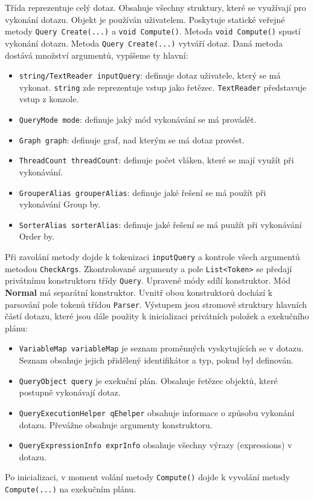 Třída reprezentuje celý dotaz.
Obsahuje všechny struktury, které se využívají pro vykonání dotazu.
Objekt je používán uživatelem.
Poskytuje statické veřejné metody \texttt{Query Create(...)} a \texttt{void Compute()}.
Metoda \texttt{void Compute()} spustí vykonání dotazu.
Metoda \texttt{Query Create(...)} vytváří dotaz.
Daná metoda dostává množství argumentů, vypíšeme ty hlavní:
\begin{itemize}
\item \texttt{string/TextReader inputQuery}: definuje dotaz uživatele, který se má vykonat. \texttt{string} zde reprezentuje vstup jako řetězec. \texttt{TextReader} představuje vstup z konzole.
\item \texttt{QueryMode mode}: definuje jaký mód vykonávání se má provádět.
\item \texttt{Graph graph}: definuje graf, nad kterým se má dotaz provést.
\item \texttt{ThreadCount threadCount}: definuje počet vláken, které se mají využít při vykonávání.
\item \texttt{GrouperAlias grouperAlias}: definuje jaké řešení se má použít při vykonávání Group by.
\item \texttt{SorterAlias sorterAlias}: definuje jaké řešení se má puužít při vykonávání Order by.
\end{itemize}
Při zavolání metody dojde k tokenizaci \texttt{inputQuery} a kontrole všech argumentů metodou \texttt{CheckArgs}.
Zkontrolované argumenty a pole \texttt{List<Token>} se předají privátnímu konstruktoru třídy \texttt{Query}.
Upravené módy sdílí konstruktor. Mód \textbf{Normal} má separátní konstruktor.
Uvnitř obou konstruktorů dochází k parsování pole tokenů třídou \texttt{Parser}.
Výstupem jsou stromové struktury hlavních částí dotazu, které jsou dále použity k inicializaci privátních položek a exekučního plánu:
\begin{itemize}
\item \texttt{VariableMap variableMap} je seznam proměnných vyskytujících se v dotazu. Seznam obsahuje jejich přidělený identifikátor a typ, pokud byl definován.
\item \texttt{QueryObject query} je exekuční plán. Obsahuje řetězec objektů, které postupně vykonávají dotaz.
\item \texttt{QueryExecutionHelper qEhelper} obsahuje informace o způsobu vykonání dotazu. Převážne obsahuje argumenty konstruktoru. 
\item \texttt{QueryExpressionInfo exprInfo} obsahuje všechny výrazy (expressions) v dotazu.
\end{itemize}
Po inicializaci, v moment volání metody \texttt{Compute()} dojde k vyvolání metody \texttt{Compute(...)} na exekučním plánu.

